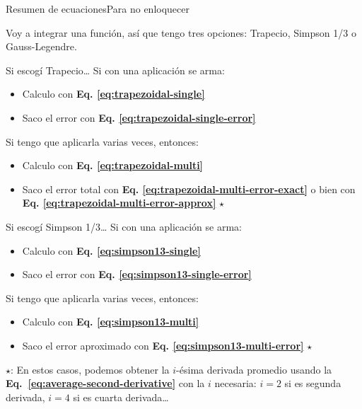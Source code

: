 \documentclass[spanish, c, dvipsnames]{beamer}
\newcommand{\contrastA}[1]{{\color{red} #1}}
\newcommand{\contrastB}[1]{{\color{blue} #1}}
\newcommand{\contrastC}[1]{{\color{ForestGreen} #1}}
\begin{document}
\begin{frame}[t, allowframebreaks]{Resumen de ecuaciones}{Para no enloquecer}

Voy a integrar una función, así que tengo tres opciones: \contrastA{Trapecio}, \contrastB{Simpson 1/3} o \contrastC{Gauss-Legendre}.

\begin{alertblock}{Si escogí Trapecio\dots}
    Si con una aplicación se arma:
    \begin{itemize}
        \itemsep1ex
        \item Calculo con \textbf{Eq. \ref{eq:trapezoidal-single}}
        \item Saco el error con \textbf{Eq. \ref{eq:trapezoidal-single-error}}
    \end{itemize}
    Si tengo que aplicarla varias veces, entonces:
    \begin{itemize}
        \itemsep1ex
        \item Calculo con \textbf{Eq. \ref{eq:trapezoidal-multi}}
        \item Saco el error total con \textbf{Eq. \ref{eq:trapezoidal-multi-error-exact}} o bien con \textbf{Eq. \ref{eq:trapezoidal-multi-error-approx}} $\star$
    \end{itemize}
\end{alertblock}

\begin{block}{Si escogí Simpson 1/3\dots}
    Si con una aplicación se arma:
    \begin{itemize}
        \itemsep1ex
        \item Calculo con \textbf{Eq. \ref{eq:simpson13-single}}
        \item Saco el error con \textbf{Eq. \ref{eq:simpson13-single-error}}
    \end{itemize}
    Si tengo que aplicarla varias veces, entonces:
    \begin{itemize}
        \itemsep1ex
        \item Calculo con \textbf{Eq. \ref{eq:simpson13-multi}}
        \item Saco el error aproximado con \textbf{Eq. \ref{eq:simpson13-multi-error}} $\star$
    \end{itemize}
\end{block}

\bigskip

$\star$: En estos casos, podemos obtener la $i$-ésima derivada promedio usando la \textbf{Eq.~\ref{eq:average-second-derivative}} con la $i$ necesaria: $i=2$ si es segunda derivada, $i=4$ si es cuarta derivada\dots


\end{frame}
\end{document}
